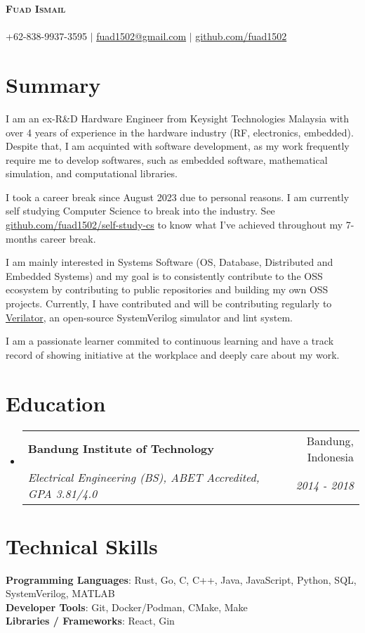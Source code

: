\documentclass[letterpaper,11pt]{article}
\makeatletter
\newcommand{\resumeSubheading}[4]{
  \vspace{-2pt}\item
    \begin{tabular*}{0.97\textwidth}[t]{l@{\extracolsep{\fill}}r}
      \textbf{#1} & #2 \\
      \textit{\small#3} & \textit{\small #4} \\
    \end{tabular*}\vspace{-7pt}
}
\newcommand{\resumeSubHeadingListStart}{\begin{itemize}[leftmargin=0.15in, label={}]}
\newcommand{\resumeSubHeadingListEnd}{\end{itemize}}
\makeatother
\begin{document}
\begin{center}
  \textbf{\Huge \scshape Fuad Ismail} \\ \vspace{1pt}
  \small \textit{} \\
  +62-838-9937-3595 $|$ \href{mailto:fuad1502@gmail.com}{fuad1502@gmail.com} $|$ 
  \href{https://github.com/fuad1502}{github.com/fuad1502}
\end{center}

\section*{Summary}
\justifying
I am an ex-R\&D Hardware Engineer from Keysight Technologies Malaysia with over
4 years of experience in the hardware industry (RF, electronics, embedded).
Despite that, I am acquinted with software development, as my work frequently
require me to develop softwares, such as embedded software, mathematical
simulation, and computational libraries.

I took a career break since August 2023 due to personal reasons. I am currently
self studying Computer Science to break into the industry. See
\href{https://github.com/fuad1502/self-study-cs}{github.com/fuad1502/self-study-cs}
to know what I've achieved throughout my 7-months career break.

I am mainly interested in Systems Software (OS, Database, Distributed and
Embedded Systems) and my goal is to consistently contribute to the OSS
ecosystem by contributing to public repositories and building my own OSS
projects. Currently, I have contributed and will be contributing regularly to
\href{https://github.com/verilator/verilator}{Verilator}, an open-source
SystemVerilog simulator and lint system. 

I am a passionate learner commited to continuous learning and have a track
record of showing initiative at the workplace and deeply care about my work.

\section{Education}
\resumeSubHeadingListStart
\resumeSubheading
  {Bandung Institute of Technology}{Bandung, Indonesia}
  {Electrical Engineering (BS), ABET Accredited, GPA
  3.81/4.0}{2014 - 2018}
\resumeSubHeadingListEnd

\section{Technical Skills}
\begin{itemize}[leftmargin=0.15in, label={}]
\small{\item{
  \textbf{Programming Languages}{: Rust, Go, C, C++, Java, JavaScript,
  Python, SQL, SystemVerilog, MATLAB} \\
  \textbf{Developer Tools}{: Git, Docker/Podman, CMake, Make} \\
  \textbf{Libraries / Frameworks}{: React, Gin}
}}
\end{itemize}
\end{document}
